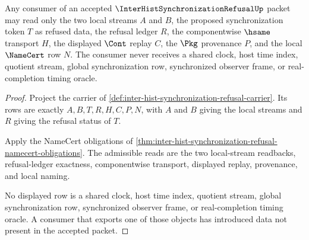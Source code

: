 \begin{theorem}
\label{thm:inter-hist-synchronization-refusal-no-global-clock-boundary}
Any consumer of an accepted $\InterHistSynchronizationRefusalUp$ packet may read only the two local streams $A$ and $B$, the proposed synchronization token $T$ as refused data, the refusal ledger $R$, the componentwise $\hsame$ transport $H$, the displayed $\Cont$ replay $C$, the $\Pkg$ provenance $P$, and the local $\NameCert$ row $N$. The consumer never receives a shared clock, host time index, quotient stream, global synchronization row, synchronized observer frame, or real-completion timing oracle.
\end{theorem}
\begin{proof}
Project the carrier of \autoref{def:inter-hist-synchronization-refusal-carrier}. Its rows are exactly $A,B,T,R,H,C,P,N$, with $A$ and $B$ giving the local streams and $R$ giving the refusal status of $T$.

Apply the NameCert obligations of \autoref{thm:inter-hist-synchronization-refusal-namecert-obligations}. The admissible reads are the two local-stream readbacks, refusal-ledger exactness, componentwise transport, displayed replay, provenance, and local naming.

No displayed row is a shared clock, host time index, quotient stream, global synchronization row, synchronized observer frame, or real-completion timing oracle. A consumer that exports one of those objects has introduced data not present in the accepted packet.
\end{proof}



